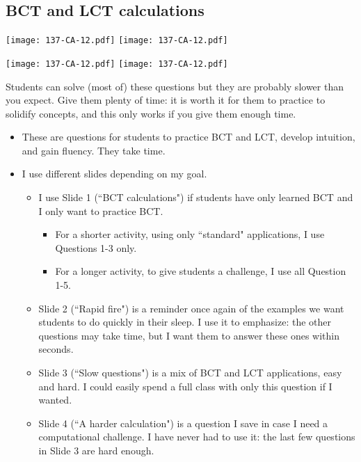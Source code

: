 \documentclass[11pt]{article}
\newcommand{\nl}{\hfill \vspace{-1.1\baselineskip}} %
\begin{document}
\newpage
\subsection{BCT and LCT calculations}

\begin{center}
{ \texttt{[image: 137-CA-12.pdf]}} \quad
{ \texttt{[image: 137-CA-12.pdf]}} 

{ \texttt{[image: 137-CA-12.pdf]}} \quad
{ \texttt{[image: 137-CA-12.pdf]}} 
\end{center}

\begin{warning}
	Students can solve (most of) these questions but they are probably slower than you expect.  Give them plenty of time: it is worth it for them to practice to solidify concepts, and this only works if you give them enough time.
\end{warning}


\begin{comments}
\nl
	\begin{itemize}
		\item These are questions for students to practice BCT and LCT, develop intuition, and gain fluency.  They take time.
		\item I use different slides depending on my goal.
			\begin{itemize}
				\item  I use Slide 1 (``BCT calculations") if students have only learned BCT and I only want to practice BCT.
					\begin{itemize}
						\item  For a shorter activity, using only ``standard" applications, I use Questions 1-3 only.
						\item  For a longer activity, to give students a challenge, I use all Question 1-5.
					\end{itemize}
				\item  Slide 2 (``Rapid fire") is a reminder once again of the examples we want students to do quickly in their sleep.    I use it to emphasize: the other questions may take time, but I want them to answer these ones within seconds.
				\item  Slide 3 (``Slow questions") is a mix of BCT and LCT applications, easy and hard.  I could easily spend a full class with only this question if I wanted.
				\item Slide 4 (``A harder calculation") is a question I save in case I need a computational challenge.  I have never had to use it: the last few questions in Slide 3 are hard enough.
			\end{itemize}
	\end{itemize}
\end{comments}
\end{document}
